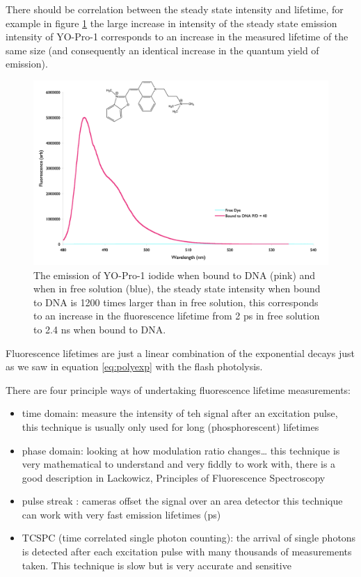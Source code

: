 \documentclass[
]{book}
\begin{document}
There should be correlation between the steady state intensity and lifetime, for example in figure \ref{fig:lifetimeSS} the large increase in intensity of the steady state emission intensity of YO-Pro-1 corresponds to an increase in the measured lifetime of the same size (and consequently an identical increase in the quantum yield of emission).

\begin{figure}

{\centering \includegraphics[width=0.6\linewidth]{images/lifetimeSS} 

}

\caption{The emission of YO-Pro-1 iodide when bound to DNA (pink) and when in free solution (blue), the steady state intensity  when bound to DNA is 1200 times larger than in free solution, this corresponds to an increase in the fluorescence lifetime from 2 ps in free solution to 2.4 ns when bound to DNA.}\label{fig:lifetimeSS}
\end{figure}

Fluorescence lifetimes are just a linear combination of the exponential decays just as we saw in equation \eqref{eq:polyexp} with the flash photolysis.

There are four principle ways of undertaking fluorescence lifetime measurements:

\begin{itemize}
\item
  time domain: measure the intensity of teh signal after an excitation pulse, this technique is usually only used for long (phosphorescent) lifetimes
\item
  phase domain: looking at how modulation ratio changes\ldots{} this technique is very mathematical to understand and very fiddly to work with, there is a good description in Lackowicz, Principles of Fluorescence Spectroscopy
\item
  pulse streak : cameras offset the signal over an area detector this technique can work with very fast emission lifetimes (ps)
\item
  TCSPC (time correlated single photon counting): the arrival of single photons is detected after each excitation pulse with many thousands of measurements taken. This technique is slow but is very accurate and sensitive
\end{itemize}
\end{document}
